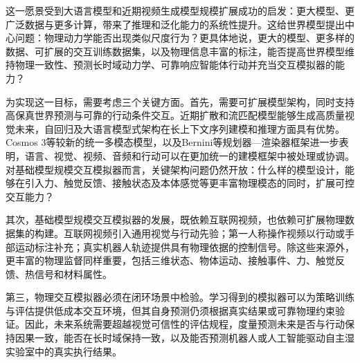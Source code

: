 这一愿景受到大语言模型和近期视频生成模型规模扩展成功的启发：更大模型、更广泛数据与更多计算，带来了推理和泛化能力的系统性提升。这给世界模型提出中心问题：物理动力学能否出现类似尺度行为？更具体地说，更大的模型、更多样的数据、可扩展的交互训练数据集，以及物理信息丰富的标注，能否提高世界模型维持物理一致性、预测长时域动力学、可靠响应智能体行动并充当交互模拟器的能力？

为实现这一目标，需要考虑三个关键方面。首先，需要可扩展模型架构，同时支持高保真世界预测与可靠的行动条件交互。近期扩散和流匹配模型能够生成高质量视觉未来，自回归及大语言模型式架构在长上下文序列建模和推理方面具有优势。Cosmos 3等较新的统一多模态模型，以及Bernini等规划器—渲染器框架进一步表明，语言、视觉、视频、音频和行动可以在更加统一的建模框架中被处理或协调。对基础模型规模交互模拟器而言，关键架构问题仍然开放：什么样的模型设计，能够在引入力、触觉反馈、接触状态及本体感觉等更丰富物理模态的同时，扩展可控交互能力？

其次，基础模型规模交互模拟器的发展，既依赖互联网视频，也依赖可扩展物理数据集的构建。互联网视频引入通用视觉与行动先验；第一人称操作视频以行动或手部运动标注补充；真实机器人轨迹提供具有物理依据的控制信号。除这些来源外，更丰富的物理监督同样重要，包括三维状态、物体运动、接触事件、力、触觉反馈、热信号和材料属性。

第三，物理交互模拟器必须在闭环场景中检验。学习得到的模拟器可以为策略训练与评估提供低成本交互环境，但其自身预测仍须根据真实结果或可靠物理约束验证。因此，未来系统需要超越视觉可信性的评估规程，度量预测未来是否与行动保持因果一致，能否在长时域保持一致，以及能否预测机器人或人工智能驱动自主湿实验室中的真实执行结果。
